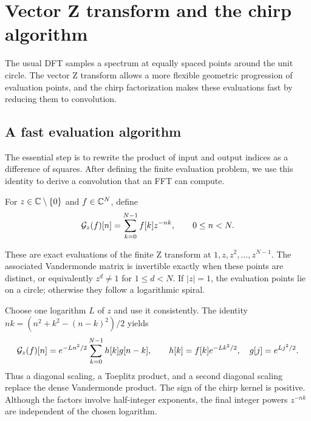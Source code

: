\section{Vector Z transform and the chirp algorithm}
\label{sect1-trans-Z-vector}

The usual DFT samples a spectrum at equally spaced points around the unit
circle. The vector Z transform allows a more flexible geometric progression
of evaluation points, and the chirp factorization makes these evaluations
fast by reducing them to convolution.

\subsection{A fast evaluation algorithm}
\label{sect2-algo-trans-z}

The essential step is to rewrite the product of input and output indices as
a difference of squares. After defining the finite evaluation problem, we
use this identity to derive a convolution that an FFT can compute.

\begin{defn}
\label{notation-63}
For $z\in\mathbb{C}\setminus\{0\}$ and $f\in\mathbb{C}^N$, define
\begin{equation}
\label{eq-defn-z-transform-vector}
 \mathcal{G}_z(f)[n]=\sum_{k=0}^{N-1}f[k]z^{-nk},\qquad 0\leq n<N.
\end{equation}
\end{defn}
These are exact evaluations of the finite Z transform at
$1,z,z^2,\ldots,z^{N-1}$. The associated Vandermonde matrix is invertible
exactly when these points are distinct, or equivalently
$z^d\ne1$ for $1\leq d<N$. If $|z|=1$, the evaluation points lie on a circle;
otherwise they follow a logarithmic spiral.

Choose one logarithm $L$ of $z$ and use it consistently. The identity
$nk=(n^2+k^2-(n-k)^2)/2$ yields
\[
 \mathcal{G}_z(f)[n]=e^{-Ln^2/2}\sum_{k=0}^{N-1}h[k]g[n-k],\qquad
 h[k]=f[k]e^{-Lk^2/2},\quad g[j]=e^{Lj^2/2}.
\]
Thus a diagonal scaling, a Toeplitz product, and a second diagonal scaling
replace the dense Vandermonde product. The sign of the chirp kernel is
positive. Although the factors involve half-integer exponents, the final
integer powers $z^{-nk}$ are independent of the chosen logarithm.

